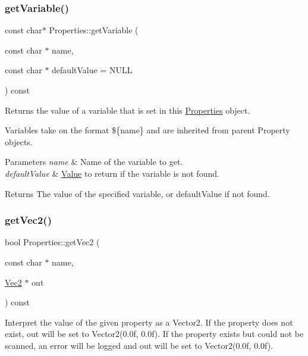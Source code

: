 \subsubsection{\texorpdfstring{get\+Variable()}{getVariable()}\hspace{0.1cm}{\footnotesize\ttfamily [2/2]}}
{\footnotesize\ttfamily const char$\ast$ Properties\+::get\+Variable (\begin{DoxyParamCaption}\item[{const char $\ast$}]{name,  }\item[{const char $\ast$}]{default\+Value = {\ttfamily NULL} }\end{DoxyParamCaption}) const}

Returns the value of a variable that is set in this \hyperlink{classProperties}{Properties} object.

Variables take on the format \$\{name\} and are inherited from parent Property objects.


\begin{DoxyParams}{Parameters}
{\em name} & Name of the variable to get. \\
\hline
{\em default\+Value} & \hyperlink{classValue}{Value} to return if the variable is not found.\\
\hline
\end{DoxyParams}
\begin{DoxyReturn}{Returns}
The value of the specified variable, or default\+Value if not found. 
\end{DoxyReturn}
\mbox{\label{classProperties_ad1eacd687cc1f90c31dba67e071aac62}} 
\subsubsection{\texorpdfstring{get\+Vec2()}{getVec2()}\hspace{0.1cm}{\footnotesize\ttfamily [1/2]}}
{\footnotesize\ttfamily bool Properties\+::get\+Vec2 (\begin{DoxyParamCaption}\item[{const char $\ast$}]{name,  }\item[{\hyperlink{classVec2}{Vec2} $\ast$}]{out }\end{DoxyParamCaption}) const}

Interpret the value of the given property as a Vector2. If the property does not exist, out will be set to Vector2(0.\+0f, 0.\+0f). If the property exists but could not be scanned, an error will be logged and out will be set to Vector2(0.\+0f, 0.\+0f).


